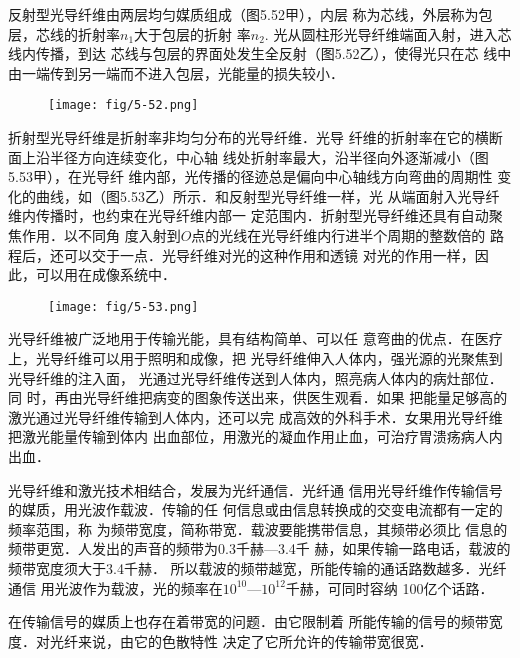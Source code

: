 反射型光导纤维由两层均匀媒质组成（图5.52甲），内层
称为芯线，外层称为包层，芯线的折射率$n_1$大于包层的折射
率$n_2$. 光从圆柱形光导纤维端面入射，进入芯线内传播，到达
芯线与包层的界面处发生全反射（图5.52乙），使得光只在芯
线中由一端传到另一端而不进入包层，光能量的损失较小．
\begin{figure}[htp]\centering
\texttt{[image: fig/5-52.png]}
    \caption{}
    \end{figure}

折射型光导纤维是折射率非均匀分布的光导纤维．光导
纤维的折射率在它的横断面上沿半径方向连续变化，中心轴
线处折射率最大，沿半径向外逐渐减小（图5.53甲），在光导纤
维内部，光传播的径迹总是偏向中心轴线方向弯曲的周期性
变化的曲线，如（图5.53乙）所示．和反射型光导纤维一样，光
从端面射入光导纤维内传播时，也约束在光导纤维内部一
定范围内．折射型光导纤维还具有自动聚焦作用．以不同角
度入射到$O$点的光线在光导纤维内行进半个周期的整数倍的
路程后，还可以交于一点．光导纤维对光的这种作用和透镜
对光的作用一样，因此，可以用在成像系统中．
\begin{figure}[htp]\centering
    \texttt{[image: fig/5-53.png]}
        \caption{}
        \end{figure}

光导纤维被广泛地用于传输光能，具有结构简单、可以任
意弯曲的优点．在医疗上，光导纤维可以用于照明和成像，把
光导纤维伸入人体内，强光源的光聚焦到光导纤维的注入面，
光通过光导纤维传送到人体内，照亮病人体内的病灶部位．同
时，再由光导纤维把病变的图象传送出来，供医生观看．如果
把能量足够高的激光通过光导纤维传输到人体内，还可以完
成高效的外科手术．女果用光导纤维把激光能量传输到体内
出血部位，用激光的凝血作用止血，可治疗胃溃疡病人内
出血．

光导纤维和激光技术相结合，发展为光纤通信．光纤通
信用光导纤维作传输信号的媒质，用光波作载波．传输的任
何信息或由信息转换成的交变电流都有一定的频率范围，称
为频带宽度，简称带宽．载波要能携带信息，其频带必须比
信息的频带更宽．人发出的声音的频带为0.3千赫—3.4千
赫，如果传输一路电话，载波的频带宽度须大于3.4千赫．
所以载波的频带越宽，所能传输的通话路数越多．光纤通信
用光波作为载波，光的频率在$10^{10}$—$10^{12}$千赫，可同时容纳
100亿个话路．

在传输信号的媒质上也存在着带宽的问题．由它限制着
所能传输的信号的频带宽度．对光纤来说，由它的色散特性
决定了它所允许的传输带宽很宽．

